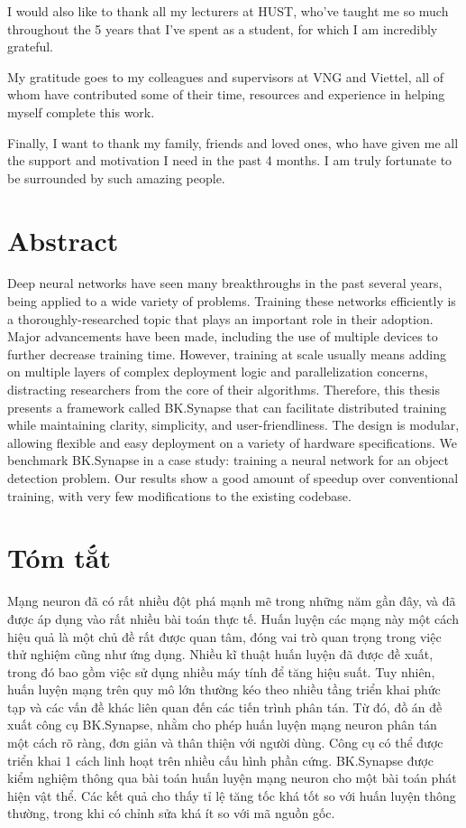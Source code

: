 \documentclass[a4paper, 12pt, oneside]{report}
\begin{document}
I would also like to thank all my lecturers at HUST, who've taught me so much throughout the 5 years that I've spent as a student, for which I am incredibly grateful.

My gratitude goes to my colleagues and supervisors at VNG and Viettel, all of whom have contributed some of their time, resources and experience in helping myself complete this work.

Finally, I want to thank my family, friends and loved ones, who have given me all the support and motivation I need in the past 4 months. I am truly fortunate to be surrounded by such amazing people.

\pagebreak

\chapter*{Abstract}
Deep neural networks have seen many breakthroughs in the past several years, being applied to a wide variety of problems. Training these networks efficiently is a thoroughly-researched topic that plays an important role in their adoption. Major advancements have been made, including the use of multiple devices to further decrease training time. However, training at scale usually means adding on multiple layers of complex deployment logic and parallelization concerns, distracting researchers from the core of their algorithms. Therefore, this thesis presents a framework called BK.Synapse that can facilitate distributed training while maintaining clarity, simplicity, and user-friendliness. The design is modular, allowing flexible and easy deployment on a variety of hardware specifications. We benchmark BK.Synapse in a case study: training a neural network for an object detection problem. Our results show a good amount of speedup over conventional training, with very few modifications to the existing codebase.

\chapter*{Tóm tắt}
Mạng neuron đã có rất nhiều đột phá mạnh mẽ trong những năm gần đây, và đã được áp dụng vào rất nhiều bài toán thực tế. Huấn luyện các mạng này một cách hiệu quả là một chủ đề rất được quan tâm, đóng vai trò quan trọng trong việc thử nghiệm cũng như ứng dụng. Nhiều kĩ thuật huấn luyện đã được đề xuất, trong đó bao gồm việc sử dụng nhiều máy tính để tăng hiệu suất. Tuy nhiên, huấn luyện mạng trên quy mô lớn thường kéo theo nhiều tầng triển khai phức tạp và các vấn đề khác liên quan đến các tiến trình phân tán. Từ đó, đồ án đề xuất công cụ BK.Synapse, nhằm cho phép huấn luyện mạng neuron phân tán một cách rõ ràng, đơn giản và thân thiện với người dùng. Công cụ có thể được triển khai 1 cách linh hoạt trên nhiều cấu hình phần cứng. BK.Synapse được kiểm nghiệm thông qua bài toán huấn luyện mạng neuron cho một bài toán phát hiện vật thể. Các kết quả cho thấy tỉ lệ tăng tốc khá tốt so với huấn luyện thông thường, trong khi có chỉnh sửa khá ít so với mã nguồn gốc.
\end{document}

